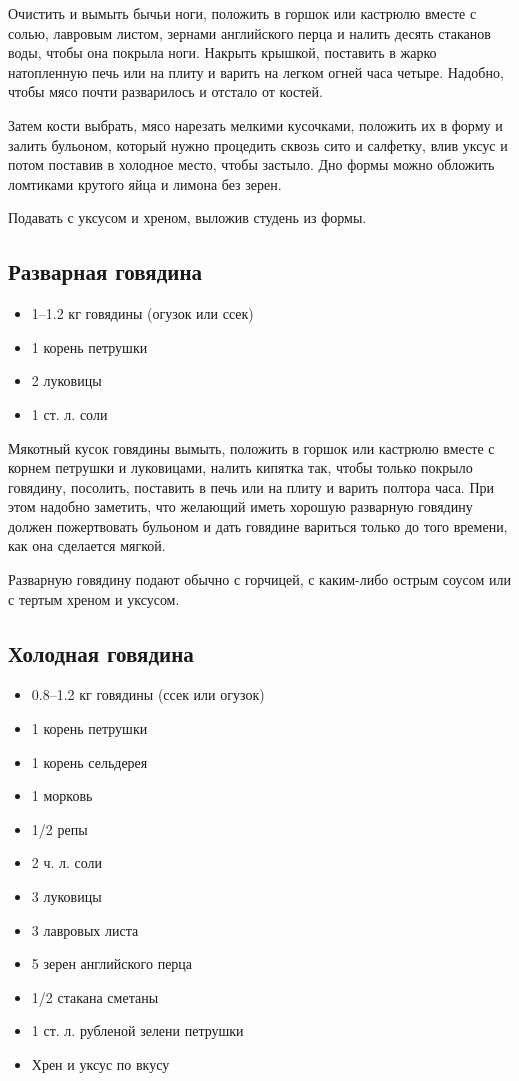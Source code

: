 Очистить и вымыть бычьи ноги, положить в горшок или кастрюлю вместе с солью, лавровым листом, зернами английского перца и налить десять стаканов воды, чтобы она покрыла ноги. Накрыть крышкой, поставить в жарко натопленную печь или на плиту и варить на легком огней часа четыре. Надобно, чтобы мясо почти разварилось и отстало от костей.

Затем кости выбрать, мясо нарезать мелкими кусочками, положить их в форму и залить бульоном, который нужно процедить сквозь сито и салфетку, влив уксус и потом поставив в холодное место, чтобы застыло. Дно формы можно обложить ломтиками крутого яйца и лимона без зерен.

Подавать с уксусом и хреном, выложив студень из формы.

\subsection{Разварная говядина}

\begin{itemize}
	\item 1–1.2 кг говядины (огузок или ссек) 
    \item 1 корень петрушки 
    \item 2 луковицы 
    \item 1 ст. л. соли
\end{itemize}

Мякотный кусок говядины вымыть, положить в горшок или кастрюлю вместе с корнем петрушки и луковицами, налить кипятка так, чтобы только покрыло говядину, посолить, поставить в печь или на плиту и варить полтора часа. При этом надобно заметить, что желающий иметь хорошую разварную говядину должен пожертвовать бульоном и дать говядине вариться только до того времени, как она сделается мягкой.

Разварную говядину подают обычно с горчицей, с каким-либо острым соусом или с тертым хреном и уксусом.

\subsection{Холодная говядина}

\begin{itemize}
	\item 0.8–1.2 кг говядины (ссек или огузок)
	\item 1 корень петрушки 
    \item 1 корень сельдерея
    \item 1 морковь 
    \item 1/2 репы 
    \item 2 ч. л. соли
    \item 3 луковицы
    \item 3 лавровых листа
    \item 5 зерен английского перца
    \item 1/2 стакана сметаны
    \item 1 ст. л. рубленой зелени петрушки
    \item Хрен и уксус по вкусу
\end{itemize}

